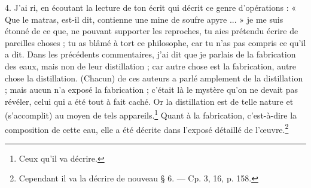 \documentclass[a4paper, 11pt, oneside, polutonikogreek, french]{article}
\begin{document}
4. J'ai ri, en écoutant la lecture de ton écrit qui décrit ce genre d'opérations : « Que le matras, est-il dit, contienne une mine de soufre apyre ... » je me suis étonné de ce que, ne pouvant supporter les reproches, tu aies prétendu écrire de pareilles choses ; tu as blâmé à tort ce philosophe, car tu n'as pas compris ce qu'il a dit. Dans les précédents commentaires, j'ai dit que je parlais de la fabrication des eaux, mais non de leur distillation ; car autre chose est la fabrication, autre chose la distillation. (Chacun) de ces auteurs a parlé amplement de la distillation ; mais aucun n'a exposé la fabrication ; c'était là le mystère qu'on ne devait pas révéler, celui qui a été tout à fait caché. Or la distillation est de telle nature et (s'accomplit) au moyen de tels appareils.\footnote{Ceux qu'il va décrire.} Quant à la fabrication, c'est-à-dire la composition de cette eau, elle a été décrite dans l'exposé détaillé de l'œuvre.\footnote{Cependant il va la décrire de nouveau § 6. --- Cp. 3, 16, p. 158.}
\end{document}
